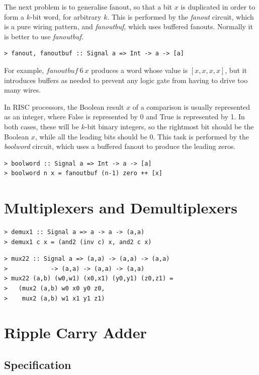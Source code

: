 \documentclass[a4paper,openany,fleqn]{book}
\begin{document}
The next problem is to generalise fanout, so that a bit $x$ is
duplicated in order to form a $k$-bit word, for arbitrary $k$.  This
is performed by the \textit{fanout} circuit, which is a pure wiring
pattern, and \textit{fanoutbuf}, which uses buffered fanouts.
Normally it is better to use \textit{fanoutbuf}.

\begin{verbatim}
> fanout, fanoutbuf :: Signal a => Int -> a -> [a]
\end{verbatim}

For example, $\mathit{fanoutbuf}\ 6\ x$ produces a word whose value is
$[x,x,x,x]$, but it introduces buffers as needed to prevent any logic
gate from having to drive too many wires.

In RISC processors, the Boolean result $x$ of a comparison is usually
represented as an integer, where False is represented by 0 and True is
represented by 1.  In both cases, these will be $k$-bit binary
integers, so the rightmost bit should be the Boolean $x$, while all
the leading bits should be 0.  This task is performed by the
\textit{boolword} circuit, which uses a buffered fanout to produce the
leading zeros.

\begin{verbatim}
> boolword :: Signal a => Int -> a -> [a]
> boolword n x = fanoutbuf (n-1) zero ++ [x]
\end{verbatim}

\section{Multiplexers and Demultiplexers}
\label{sec:mux-demux}

\begin{verbatim}
> demux1 :: Signal a => a -> a -> (a,a)
> demux1 c x = (and2 (inv c) x, and2 c x)
\end{verbatim}

\begin{verbatim}
> mux22 :: Signal a => (a,a) -> (a,a) -> (a,a)
>            -> (a,a) -> (a,a) -> (a,a)
> mux22 (a,b) (w0,w1) (x0,x1) (y0,y1) (z0,z1) =
>   (mux2 (a,b) w0 x0 y0 z0,
>    mux2 (a,b) w1 x1 y1 z1)
\end{verbatim}

\section{Ripple Carry Adder}
\label{sec:ripple-carry-adder}

\subsection{Specification}
\label{sec:adder-specification}
\end{document}
